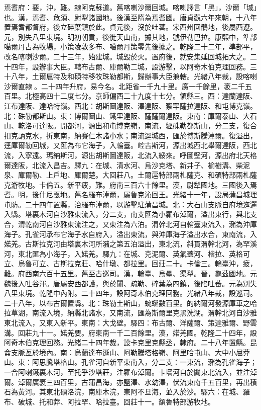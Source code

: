 \begin{pinyinscope}
焉耆府：要，沖，難。隸阿克蘇道。舊喀喇沙爾回城。喀喇譯言「黑」，沙爾「城」也。漢，焉耆、危須、尉犁諸國地。後漢至隋為焉耆國。唐貞觀六年來朝，十八年置焉耆都督府，後立碎葉鎮於此。貞元後，沒於吐蕃。宋西州回鶻地，後屬西遼。元，別失八里東境。明初朝貢，後徙天山南，據其地，號伊勒巴拉。康熙中，準部噶爾丹占為牧場，小策凌敦多布、噶爾丹策零先後據之。乾隆二十二年，準部平，改名喀喇沙爾。二十三年，始建城。城毀於火。置府後，就安集延回城拓大之。二十四年，設辦事大臣。轄布古爾、庫爾勒二城，設游擊，以阿奇木伯克理回務。三十八年，土爾扈特及和碩特移牧珠勒都斯，歸辦事大臣兼轄。光緒八年裁，設喀喇沙爾直隸。二十四年升府，易今名。北距省一千九十里。廣一千餘里，袤二千五百里。北極高四十二度七分。京師偏西二十九度十七分。領縣三。西：達蘭達阪、江布達阪、達哈特嶺。西北：胡斯圖達阪、澤達阪、察罕薩拉達阪、和屯博克嶺。北：硃勒都斯山。東：博爾圖山、鐵里達阪、薩薩爾達阪。東南：庫爾泰山、大石山、乾洛可達阪。開都河，源出和屯博克嶺，南流，經硃勒都斯山，分二支，復合扣克訥克水，折東南，納賽仁木諸小水；南流逕城西，匯於博斯騰淖爾。復溢出，逕庫爾勒回城，又匯為布它海子，入輪臺。崆吉斯河，源出城西北舉爾達阪，西北流，入寧遠。瑪納斯河，源出胡斯圖達阪，北流入綏來。呼圖壁河，源出府北天格爾達阪，北流入昌吉。驛九：在城、清水河、烏沙克塔、新井子、榆樹溝、柴泥泉、庫爾勒、上戶地、庫爾楚。大回莊八。土爾扈特部兩札薩克、和碩特部兩札薩克游牧地。卡倫五。新平疲，難。府南三百六十餘里。漢，尉犁國地。三國後入焉耆。明，後什尼戛地。舊名羅布淖爾，屬魯克沁回王。光緒十一年，設局蒲昌城理屯防。二十四年置縣，治羅布淖爾，以游擊駐蒲昌城。北：大石山支脈自府境迤邐入縣。塔裏木河自沙雅東流入，分二支，南支匯為小羅布淖爾，溢出東行，與北支合，渭乾南河自沙雅東流注之，又東注為六泊。渭幹北河自輪臺東流入，瀦為沖庫海子。孔雀河承布它海子水自府入，溢出東流，與沖庫海子溢出水合，東南流，入婼羌。古斯拉克河由塔裏木河所瀦之第五泊溢出，東北流，斜貫渭幹北河，為罕溪河，東北匯為小海子，入婼羌。驛九：在城、克泥爾、英氣蓋河、楷拉、英格可立、烏魯可立、古斯拉克莊、哈什墩、都拉里。回莊二十。卡倫三。輪臺沖，疲，難。府西南六百十五里。舊至古巡司。漢，輪臺、烏壘、渠犁。晉，龜茲國地。元魏後入吐谷渾。唐屬安西都護，與於闐、疏勒、碎葉為四鎮，後陷吐蕃。元為別失八里東境。乾隆中內附。二十四年，設阿奇木伯克理回務。光緒八年裁，設巡司。二十八年，以布古爾置縣。北：珠勒土斯山，蜿蜒數百里。的納爾河發源庫車之哈拉草湖，南流入境，納縣北諸水，又南流，匯為斯爾里克黑洗湖。渭幹北河自沙雅東北流入，又東入新平。東南：大戈壁。驛四：布古爾、洋薩爾、策達雅爾、野雲溝。回莊九十一。婼羌要。府東南一千二百餘里。漢，婼羌國。乾隆二十四年，設阿奇木伯克理回務。光緒二十四年裁，設卡克里克縣丞，隸府。二十八年置縣。昆侖支脈亙於境內。南：烏蘭達布遜山、阿勒騰塔格嶺、阿里哈屯山、大中小屈莽山。東：阿思騰塔格山。孔雀河自新平東南入，分二支：一東流，瀦為孔雀海子；一合阿喇鐵裏木河，至托乎沙塔莊，注羅布淖爾。卡墻河自於闐東北流入，並注淖爾。淖爾廣袤三四百里，古蒲昌海，亦鹽澤、水幼澤，伏流東南千五百里，再出積石為黃河。其東北碩洛浣，南庫木浣，東阿不旦海，並入於沙。驛六：在城、羅布、破城、托和莽、阿拉罕、哈拉臺。回莊十一。額魯特部游牧地。


\end{pinyinscope}
